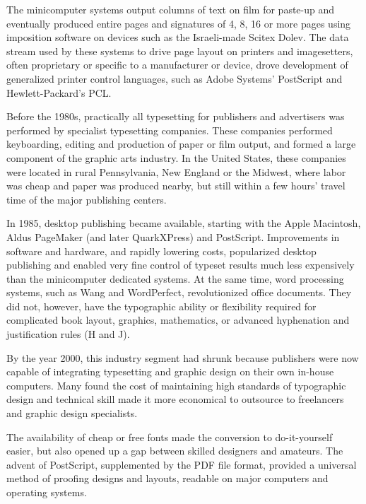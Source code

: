 \documentclass{article}
\begin{document}
The minicomputer systems output columns of text on film for paste-up and eventually produced entire pages and signatures of 4, 8, 16 or more pages using imposition software on devices such as the Israeli-made Scitex Dolev. The data stream used by these systems to drive page layout on printers and imagesetters, often proprietary or specific to a manufacturer or device, drove development of generalized printer control languages, such as Adobe Systems' PostScript and Hewlett-Packard's PCL.

Before the 1980s, practically all typesetting for publishers and advertisers was performed by specialist typesetting companies. These companies performed keyboarding, editing and production of paper or film output, and formed a large component of the graphic arts industry. In the United States, these companies were located in rural Pennsylvania, New England or the Midwest, where labor was cheap and paper was produced nearby, but still within a few hours' travel time of the major publishing centers.

In 1985, desktop publishing became available, starting with the Apple Macintosh, Aldus PageMaker (and later QuarkXPress) and PostScript. Improvements in software and hardware, and rapidly lowering costs, popularized desktop publishing and enabled very fine control of typeset results much less expensively than the minicomputer dedicated systems. At the same time, word processing systems, such as Wang and WordPerfect, revolutionized office documents. They did not, however, have the typographic ability or flexibility required for complicated book layout, graphics, mathematics, or advanced hyphenation and justification rules (H and J).

By the year 2000, this industry segment had shrunk because publishers were now capable of integrating typesetting and graphic design on their own in-house computers. Many found the cost of maintaining high standards of typographic design and technical skill made it more economical to outsource to freelancers and graphic design specialists.

The availability of cheap or free fonts made the conversion to do-it-yourself easier, but also opened up a gap between skilled designers and amateurs. The advent of PostScript, supplemented by the PDF file format, provided a universal method of proofing designs and layouts, readable on major computers and operating systems.
\end{document}
